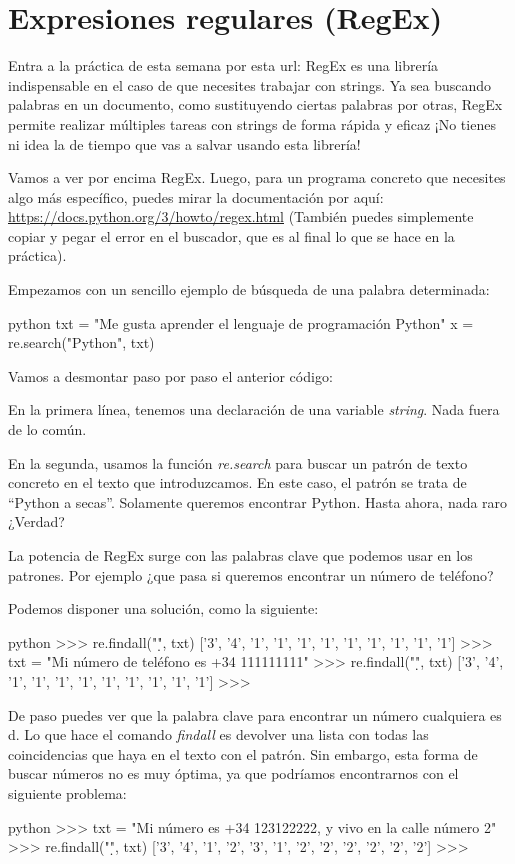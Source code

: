 \documentclass{article}
\begin{document}
\section{Expresiones regulares (RegEx)}
Entra a la práctica de esta semana por esta url: \url{}
RegEx es una librería indispensable en el caso de que necesites trabajar con strings. Ya sea buscando palabras en un documento, como sustituyendo ciertas palabras por otras, RegEx permite realizar múltiples tareas con strings de forma rápida y eficaz ¡No tienes ni idea la de tiempo que vas a salvar usando esta librería!


Vamos a ver por encima RegEx. Luego, para un programa concreto que necesites algo más específico, puedes mirar la documentación por aquí: \url{https://docs.python.org/3/howto/regex.html} (También puedes simplemente copiar y pegar el error en el buscador, que es al final lo que se hace en la práctica).

Empezamos con un sencillo ejemplo de búsqueda de una palabra determinada:

\begin{mintedbox}{python}
txt = "Me gusta aprender el lenguaje de programación Python"
x = re.search("Python", txt) 
\end{mintedbox}

Vamos a desmontar paso por paso el anterior código:


En la primera línea, tenemos una declaración de una variable \textit{string}. Nada fuera de lo común.


En la segunda, usamos la función \textit{re.search} para buscar un patrón de texto concreto en el texto que introduzcamos. En este caso, el patrón se trata de ``Python a secas''. Solamente queremos encontrar Python. Hasta ahora, nada raro ¿Verdad?


La potencia de RegEx surge con las palabras clave que podemos usar en los patrones. Por ejemplo ¿que pasa si queremos encontrar un número de teléfono?


Podemos disponer una solución, como la siguiente:

\begin{mintedbox}{python}
>>> re.findall("\d", txt)
['3', '4', '1', '1', '1', '1', '1', '1', '1', '1', '1']
>>> txt = "Mi número de teléfono es +34 111111111"
>>> re.findall("\d", txt)
['3', '4', '1', '1', '1', '1', '1', '1', '1', '1', '1']
>>>
\end{mintedbox}

De paso puedes ver que la palabra clave para encontrar un número cualquiera es d. Lo que hace el comando \textit{findall} es devolver una lista con todas las coincidencias que haya en el texto con el patrón. Sin embargo, esta forma de buscar números no es muy óptima, ya que podríamos encontrarnos con el siguiente problema:
\begin{mintedbox}{python}
>>> txt = "Mi número es +34 123122222, y vivo en la calle número 2"
>>> re.findall("\d", txt)
['3', '4', '1', '2', '3', '1', '2', '2', '2', '2', '2', '2']
>>>
\end{mintedbox}
\end{document}
